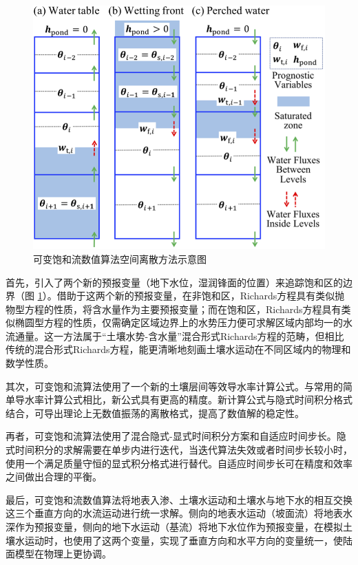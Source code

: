 {
\begin{figure}[htbp]
\centering
\includegraphics{Figures/陆地表面的水分循环/可变饱和流数值算法预报区域空间结构示意图.png}
\caption{可变饱和流数值算法空间离散方法示意图}
\label{fig:可变饱和流数值算法预报区域空间结构示意图}
\end{figure}
}

首先，引入了两个新的预报变量（地下水位，湿润锋面的位置）来追踪饱和区的边界（图 \ref{fig:可变饱和流数值算法预报区域空间结构示意图}）。借助于这两个新的预报变量，在非饱和区，Richards方程具有类似抛物型方程的性质，将含水量作为主要预报变量；而在饱和区，Richards方程具有类似椭圆型方程的性质，仅需确定区域边界上的水势压力便可求解区域内部均一的水流通量。这一方法属于“土壤水势-含水量”混合形式Richards方程的范畴，但相比传统的混合形式Richards方程，能更清晰地刻画土壤水运动在不同区域内的物理和数学性质。

其次，可变饱和流算法使用了一个新的土壤层间等效导水率计算公式。与常用的简单导水率计算公式相比，新公式具有更高的精度。新计算公式与隐式时间积分格式结合，可导出理论上无数值振荡的离散格式，提高了数值解的稳定性。

再者，可变饱和流算法使用了混合隐式-显式时间积分方案和自适应时间步长。隐式时间积分的求解需要在单步内进行迭代，当迭代算法失效或者时间步长较小时，使用一个满足质量守恒的显式积分格式进行替代。自适应时间步长可在精度和效率之间做出合理的平衡。

最后，可变饱和流数值算法将地表入渗、土壤水运动和土壤水与地下水的相互交换这三个垂直方向的水流运动进行统一求解。侧向的地表水运动（坡面流）将地表水深作为预报变量，侧向的地下水运动（基流）将地下水位作为预报变量，在模拟土壤水运动时，也使用了这两个变量，实现了垂直方向和水平方向的变量统一，使陆面模型在物理上更协调。


